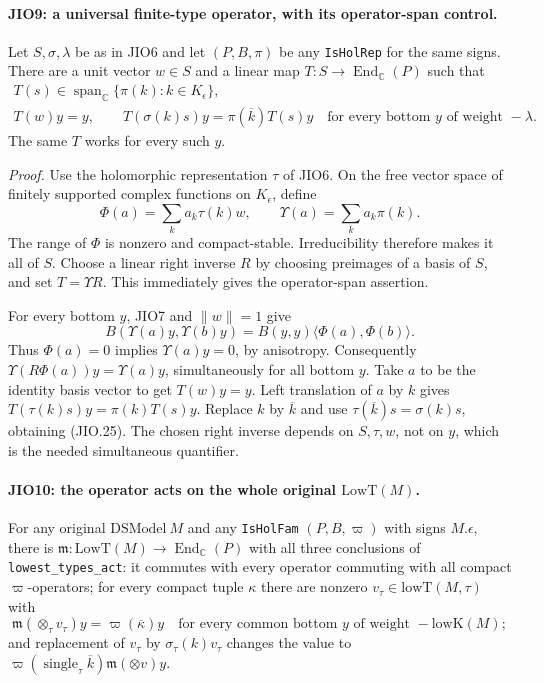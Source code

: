 \paragraph{JIO9: a universal finite-type operator, with its operator-span control.}
\label{claim:JIO9}
Let \(S,\sigma,\lambda\) be as in JIO6 and let
\((P,B,\pi)\) be any \texttt{IsHolRep} for the same signs.
There are a unit vector \(w\in S\) and a linear map
\(T:S\to\operatorname{End}_{\mathbb C}(P)\) such that
\[
 \begin{gathered}
 T(s)\in\operatorname{span}_{\mathbb C}\{\pi(k):k\in K_\epsilon\},
 \\
 T(w)y=y,\qquad
 T(\sigma(k)s)y=\pi(\overline{k})T(s)y
 \quad\text{for every bottom }y\text{ of weight }-\lambda .
 \end{gathered}
 \tag{JIO.25}
\]
The same \(T\) works for every such \(y\).

\emph{Proof.}
Use the holomorphic representation \(\tau\) of JIO6.
On the free vector space of finitely supported complex functions
on \(K_\epsilon\), define
\[
       \Phi(a)=\sum_k a_k\tau(k)w,\qquad
       \Upsilon(a)=\sum_k a_k\pi(k).
 \tag{JIO.26}
\]
The range of \(\Phi\) is nonzero and compact-stable.  Irreducibility
therefore makes it all of \(S\).  Choose a linear right inverse
\(R\) by choosing preimages of a basis of \(S\), and set
\(T=\Upsilon R\).  This immediately gives the operator-span
assertion.

For every bottom \(y\), JIO7 and \(\|w\|=1\) give
\[
 B(\Upsilon(a)y,\Upsilon(b)y)
                      =B(y,y)\langle\Phi(a),\Phi(b)\rangle .
 \tag{JIO.27}
\]
Thus \(\Phi(a)=0\) implies \(\Upsilon(a)y=0\), by anisotropy.
Consequently
\(\Upsilon(R\Phi(a))y=\Upsilon(a)y\), simultaneously for all
bottom \(y\).
Take \(a\) to be the identity basis vector to get \(T(w)y=y\).
Left translation of \(a\) by \(k\) gives
\(T(\tau(k)s)y=\pi(k)T(s)y\).
Replace \(k\) by \(\overline{k}\) and use
\(\tau(\overline{k})s=\sigma(k)s\), obtaining (JIO.25).
The chosen right inverse depends on \(S,\tau,w\), not on \(y\),
which is the needed simultaneous quantifier.

\paragraph{JIO10: the operator acts on the whole original \(\mathrm{LowT}(M)\).}
\label{claim:JIO10}
For any original \(\mathrm{DSModel}\ M\) and any
\texttt{IsHolFam} \((P,B,\varpi)\) with signs \(M.\epsilon\),
there is
\(\mathfrak m:\mathrm{LowT}(M)\to\operatorname{End}_{\mathbb C}(P)\)
with all three conclusions of \texttt{lowest\_types\_act}:
it commutes with every operator commuting with all compact
\(\varpi\)-operators; for every compact tuple \(\kappa\) there are
nonzero \(v_\tau\in\mathrm{lowT}(M,\tau)\) with
\[
 \mathfrak m(\otimes_\tau v_\tau)y
                  =\varpi(\overline{\kappa})y
       \quad\text{for every common bottom }y
                \text{ of weight }-\mathrm{lowK}(M);
 \tag{JIO.28}
\]
and replacement of \(v_\tau\) by \(\sigma_\tau(k)v_\tau\)
changes the value to
\(\varpi(\operatorname{single}_\tau\overline{k})
          \mathfrak m(\otimes v)y\).

